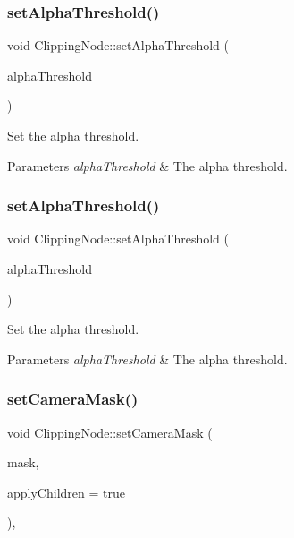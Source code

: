 \subsubsection{\texorpdfstring{set\+Alpha\+Threshold()}{setAlphaThreshold()}\hspace{0.1cm}{\footnotesize\ttfamily [1/2]}}
{\footnotesize\ttfamily void Clipping\+Node\+::set\+Alpha\+Threshold (\begin{DoxyParamCaption}\item[{G\+Lfloat}]{alpha\+Threshold }\end{DoxyParamCaption})}

Set the alpha threshold.


\begin{DoxyParams}{Parameters}
{\em alpha\+Threshold} & The alpha threshold. \\
\hline
\end{DoxyParams}
\mbox{\label{classClippingNode_ae2c59683b09c8373c705839b06a64d48}} 
\subsubsection{\texorpdfstring{set\+Alpha\+Threshold()}{setAlphaThreshold()}\hspace{0.1cm}{\footnotesize\ttfamily [2/2]}}
{\footnotesize\ttfamily void Clipping\+Node\+::set\+Alpha\+Threshold (\begin{DoxyParamCaption}\item[{G\+Lfloat}]{alpha\+Threshold }\end{DoxyParamCaption})}

Set the alpha threshold.


\begin{DoxyParams}{Parameters}
{\em alpha\+Threshold} & The alpha threshold. \\
\hline
\end{DoxyParams}
\mbox{\label{classClippingNode_afced4609ebbd5d239d1e3d07b6d4b217}} 
\subsubsection{\texorpdfstring{set\+Camera\+Mask()}{setCameraMask()}\hspace{0.1cm}{\footnotesize\ttfamily [1/2]}}
{\footnotesize\ttfamily void Clipping\+Node\+::set\+Camera\+Mask (\begin{DoxyParamCaption}\item[{unsigned short}]{mask,  }\item[{bool}]{apply\+Children = {\ttfamily true} }\end{DoxyParamCaption})\hspace{0.3cm}{\ttfamily [override]}, {\ttfamily [virtual]}}

